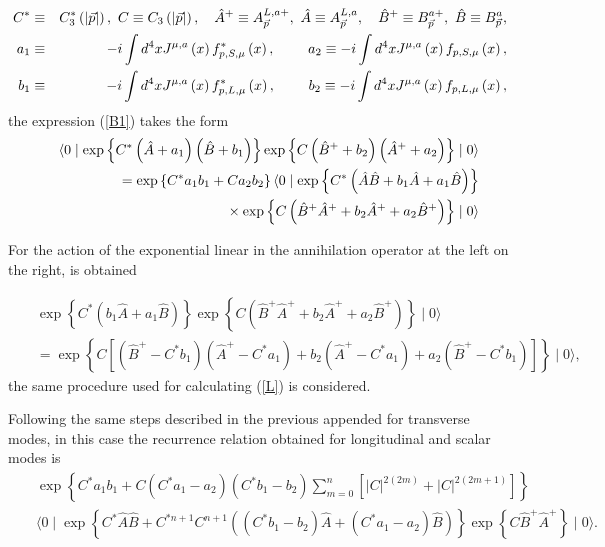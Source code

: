 \documentclass[12pt,letterpaper]{report}
\begin{document}
\begin{eqnarray}
C^{*} &\equiv &C_3^{*}\left(\left| \vec{p}\right| \right),\
C\equiv C_3\left(\left| \vec{p}\right| \right),\text{ \ \
}\hat{A}^{+}\equiv A_{ \vec{p}}^{L,a+},\ \hat{A}\equiv
A_{\vec{p}}^{L,a},\text{ \ \ }\hat{B} ^{+}\equiv
B_{\vec{p}}^{a+},\ \hat{B}\equiv B_{\vec{p}}^a, \nonumber \\ a_1
&\equiv &-i\int d^4xJ^{\mu,a}\left(x\right) f_{p,S,\mu }^{*}\left(
x\right),\text{ \qquad }a_2\equiv -i\int d^4xJ^{\mu,a}\left(
x\right) f_{p,S,\mu }\left(x\right), \nonumber \\ b_1 &\equiv
&-i\int d^4xJ^{\mu,a}\left(x\right) f_{p,L,\mu }^{*}\left(
x\right),\text{ \qquad }b_2\equiv -i\int d^4xJ^{\mu,a}\left(
x\right) f_{p,L,\mu }\left(x\right), \label{nota2}
\end{eqnarray}
the expression (\ref{B1}) takes the form
\begin{eqnarray}
&&\langle 0\mid \exp \left\{ C^{*}\left(\hat{A}+a_1\right) \left(
\hat{B} +b_1\right) \right\} \exp \left\{ C\left(
\hat{B}^{+}+b_2\right) \left(\hat{A}^{+}+a_2\right) \right\} \mid
0\rangle \nonumber \\ &&=\exp \left\{ C^{*}a_1b_1+Ca_2b_2\right\}
\langle 0\mid \exp \left\{ C^{*}\left(\hat{A}\hat{B}
+b_1\hat{A}+a_1\hat{B}\right) \right\} \nonumber
\\ &&\text{ \qquad \qquad \qquad \qquad \qquad \qquad }\times \exp
\left\{ C\left(\hat{B}^{+}\hat{A}^{+}+
b_2\hat{A}^{+}+a_2\hat{B}^{+}\right) \right\} \mid 0\rangle
\label{B2}
\end{eqnarray}

For the action of the exponential linear in the annihilation
operator at the left on the right, is obtained

\begin{eqnarray}
&&\exp \left\{ C^{*}\left(b_1\hat{A}+a_1\hat{B}\right) \right\}
\exp \left\{ C\left(
\hat{B}^{+}\hat{A}^{+}+b_2\hat{A}^{+}+a_2\hat{B}^{+}\right)
\right\} \mid 0\rangle \label{B3} \\ &&=\exp \left\{ C\left[
\left(\hat{B}^{+}-C^{*}b_1\right) \left(\hat{A}
^{+}-C^{*}a_1\right) +b_2\left(\hat{A}^{+}-C^{*}a_1\right)
+a_2\left(\hat{B }^{+}-C^{*}b_1\right) \right] \right\} \mid
0\rangle, \nonumber
\end{eqnarray}
the same procedure used for calculating (\ref{L}) is considered.

Following the same steps described in the previous appended for
transverse modes, in this case the recurrence relation obtained
for longitudinal and scalar modes is
{\setlength\arraycolsep{0.5pt}
\begin{eqnarray}
&&\exp \left\{ C^{*}a_1b_1+C\left(C^{*}a_1-a_2\right) \left(
C^{*}b_1-b_2\right) \sum\limits_{m=0}^n\left[ \left| C\right|
^{2\left(2m\right) }+\left| C\right| ^{2\left(2m+1\right) }\right]
\right\}\label{B4} \\ &&\langle 0\mid \exp \left\{
C^{*}\hat{A}\hat{B}+C^{*n+1}C^{n+1}\left(\left(
C^{*}b_1-b_2\right) \hat{A}+\left(C^{*}a_1-a_2\right)
\hat{B}\right) \right\} \exp \left\{
C\hat{B}^{+}\hat{A}^{+}\right\} \mid 0\rangle.\nonumber
\end{eqnarray}}
\end{document}
